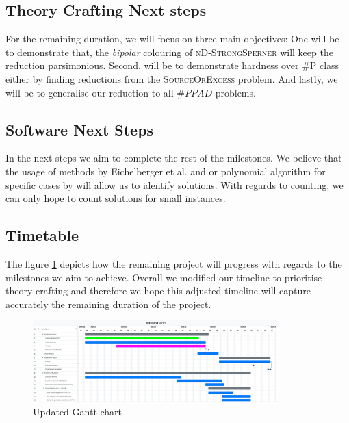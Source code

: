 \subsection{Theory Crafting Next steps}

For the remaining duration, we will focus on three main objectives:
One will be to demonstrate that, the \textit{bipolar} colouring
of \textsc{nD-StrongSperner} will keep the reduction parsimonious.
Second, will be to demonstrate hardness over \textsc{\#P} class either by finding
reductions from the \textsc{SourceOrExcess} problem.
And lastly, we will be to generalise our reduction to all $\#PPAD$ problems.


\subsection{Software Next Steps}

In the next steps we aim to complete the rest of the milestones. 
We believe that the usage of methods by Eichelberger et al. \cite{eichelberger_HazardDetectionCombinational_1965}
and or polynomial algorithm for specific cases by \cite{deligkas_PureCircuitTightInapproximability_2024}
will allow us to identify solutions. With regards to counting, we can only hope
to count solutions for small instances.


\subsection{Timetable}

The figure \ref{fig:gantt-new} depicts how the remaining project will progress with regards
to the milestones we aim to achieve. Overall we modified our timeline to prioritise
theory crafting and therefore we hope this adjusted timeline will capture accurately the remaining duration
of the project.

\begin{figure}[h!]
    \centering
    \includegraphics[width=0.85\textwidth]{assets/Interim Gantt 20250708.pdf}
    \caption{Updated Gantt chart}\label{fig:gantt-new}
\end{figure}

